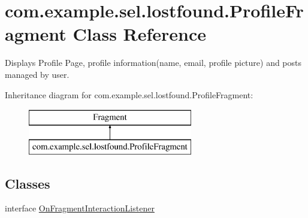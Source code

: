\hypertarget{classcom_1_1example_1_1sel_1_1lostfound_1_1ProfileFragment}{}\section{com.\+example.\+sel.\+lostfound.\+Profile\+Fragment Class Reference}
\label{classcom_1_1example_1_1sel_1_1lostfound_1_1ProfileFragment}


Displays Profile Page, profile information(name, email, profile picture) and posts managed by user.  


Inheritance diagram for com.\+example.\+sel.\+lostfound.\+Profile\+Fragment\+:\begin{figure}[H]
\begin{center}
\leavevmode
\includegraphics[height=2.000000cm]{classcom_1_1example_1_1sel_1_1lostfound_1_1ProfileFragment}
\end{center}
\end{figure}
\subsection*{Classes}
\begin{DoxyCompactItemize}
\item 
interface \hyperlink{interfacecom_1_1example_1_1sel_1_1lostfound_1_1ProfileFragment_1_1OnFragmentInteractionListener}{On\+Fragment\+Interaction\+Listener}
\end{DoxyCompactItemize}
